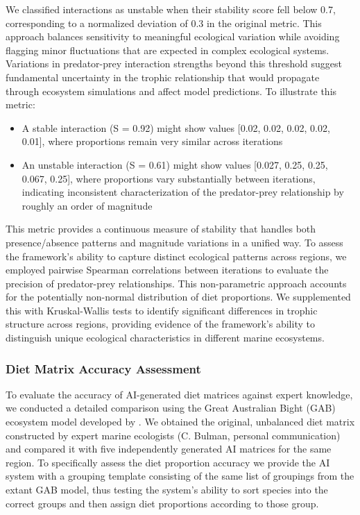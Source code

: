 We classified interactions as unstable when their stability score fell below 0.7, corresponding to a normalized deviation of 0.3 in the original metric. This approach balances sensitivity to meaningful ecological variation while avoiding flagging minor fluctuations that are expected in complex ecological systems. Variations in predator-prey interaction strengths beyond this threshold suggest fundamental uncertainty in the trophic relationship that would propagate through ecosystem simulations and affect model predictions. To illustrate this metric:

\begin{itemize}
    \item A stable interaction (S = 0.92) might show values [0.02, 0.02, 0.02, 0.02, 0.01], where proportions remain very similar across iterations
    \item An unstable interaction (S = 0.61) might show values [0.027, 0.25, 0.25, 0.067, 0.25], where proportions vary substantially between iterations, indicating inconsistent characterization of the predator-prey relationship by roughly an order of magnitude
\end{itemize}

This metric provides a continuous measure of stability that handles both presence/absence patterns and magnitude variations in a unified way. To assess the framework's ability to capture distinct ecological patterns across regions, we employed pairwise Spearman correlations between iterations to evaluate the precision of predator-prey relationships. This non-parametric approach accounts for the potentially non-normal distribution of diet proportions. We supplemented this with Kruskal-Wallis tests to identify significant differences in trophic structure across regions, providing evidence of the framework's ability to distinguish unique ecological characteristics in different marine ecosystems.

\subsubsection{Diet Matrix Accuracy Assessment}
\label{sec:accuracy_assessment}
To evaluate the accuracy of AI-generated diet matrices against expert knowledge, we conducted a detailed comparison using the Great Australian Bight (GAB) ecosystem model developed by \citet{Fulton2018}. We obtained the original, unbalanced diet matrix constructed by expert marine ecologists (C. Bulman, personal communication) and compared it with five independently generated AI matrices for the same region. To specifically assess the diet proportion accuracy we provide the AI system with a grouping template consisting of the same list of groupings from the extant GAB model, thus testing the system's ability to sort species into the correct groups and then assign diet proportions according to those group.

